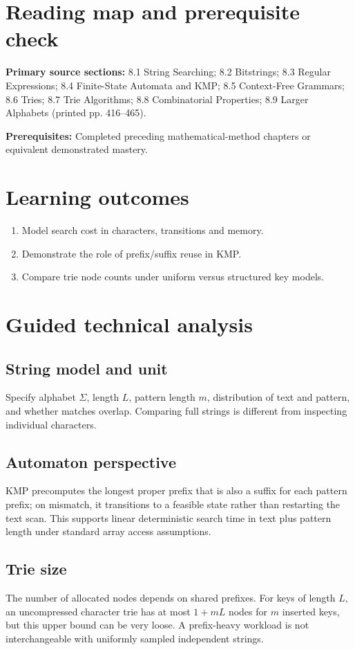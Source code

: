 \documentclass[11pt]{article}
\begin{document}
\makedoctocpage
\section{Reading map and prerequisite check}
\noindent\textbf{Primary source sections:} 8.1 String Searching; 8.2 Bitstrings; 8.3 Regular Expressions; 8.4 Finite-State Automata and KMP; 8.5 Context-Free Grammars; 8.6 Tries; 8.7 Trie Algorithms; 8.8 Combinatorial Properties; 8.9 Larger Alphabets (printed pp. 416--465).\par
\noindent\textbf{Prerequisites:} Completed preceding mathematical-method chapters or equivalent demonstrated mastery.\par
\section{Learning outcomes}
\begin{enumerate}
\item Model search cost in characters, transitions and memory.
\item Demonstrate the role of prefix/suffix reuse in KMP.
\item Compare trie node counts under uniform versus structured key models.
\end{enumerate}
\section{Guided technical analysis}
\subsection{String model and unit}
Specify alphabet $\Sigma$, length $L$, pattern length $m$, distribution of text and pattern, and whether matches overlap. Comparing full strings is different from inspecting individual characters.
\subsection{Automaton perspective}
KMP precomputes the longest proper prefix that is also a suffix for each pattern prefix; on mismatch, it transitions to a feasible state rather than restarting the text scan. This supports linear deterministic search time in text plus pattern length under standard array access assumptions.
\subsection{Trie size}
The number of allocated nodes depends on shared prefixes. For keys of length $L$, an uncompressed character trie has at most $1+mL$ nodes for $m$ inserted keys, but this upper bound can be very loose. A prefix-heavy workload is not interchangeable with uniformly sampled independent strings.
\end{document}
